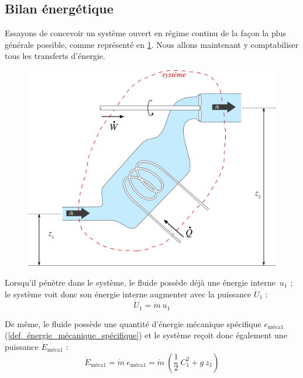 	\subsection{Bilan énergétique}

		Essayons de concevoir un système ouvert en régime continu de la façon la plus générale possible, comme représenté en \cref{fig_système_ouvert}. Nous allons maintenant y comptabiliser tous les transferts d’énergie.

		\begin{figure}
			\begin{center}
				\includegraphics[width=\textwidth]{images/sfee.png}
			\end{center}
			\label{fig_système_ouvert}
		\end{figure}

		Lorsqu’il pénètre dans le système, le fluide possède déjà une énergie interne~$u_1$ ; le système voit donc son énergie interne augmenter avec la puissance $\dot{U}_{1}$ :
		\begin{equation}
			\dot{U}_{1} = \dot{m} \ u_1
			\label{eq_w_int1}
		\end{equation}

		De même, le fluide possède une quantité d’énergie mécanique spécifique $e_\text{méca1}$ (\ref{def_énergie_mécanique_spécifique}) et le système reçoit donc également une puissance $\dot{E}_\text{méca1}$ :
		\begin{equation}
			\dot{E}_\text{méca1} = \dot m \ e_\text{méca1} = \dot{m} \ \left(\frac{1}{2} \ C_1^2 + g \ z_1\right)
			\label{eq_w_méc1}
		\end{equation}

